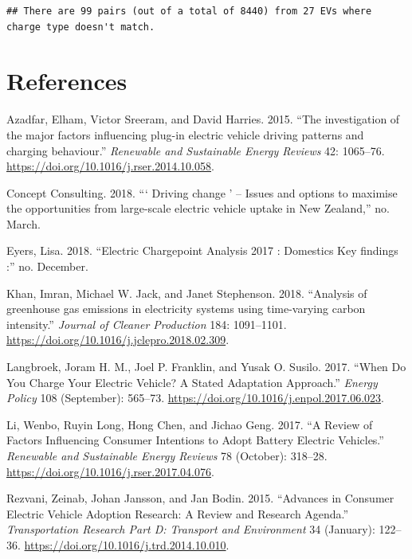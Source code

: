 \documentclass[]{article}
\begin{document}
\begin{verbatim}
## There are 99 pairs (out of a total of 8440) from 27 EVs where charge type doesn't match.
\end{verbatim}

\hypertarget{references}{%
\section*{References}\label{references}}

\hypertarget{refs}{}
\leavevmode\hypertarget{ref-Azadfar2015}{}%
Azadfar, Elham, Victor Sreeram, and David Harries. 2015. ``The investigation of the major factors influencing plug-in electric vehicle driving patterns and charging behaviour.'' \emph{Renewable and Sustainable Energy Reviews} 42: 1065--76. \url{https://doi.org/10.1016/j.rser.2014.10.058}.

\leavevmode\hypertarget{ref-ConceptConsulting2018}{}%
Concept Consulting. 2018. ``` Driving change ' -- Issues and options to maximise the opportunities from large-scale electric vehicle uptake in New Zealand,'' no. March.

\leavevmode\hypertarget{ref-Eyers2018}{}%
Eyers, Lisa. 2018. ``Electric Chargepoint Analysis 2017 : Domestics Key findings :'' no. December.

\leavevmode\hypertarget{ref-Khan2018}{}%
Khan, Imran, Michael W. Jack, and Janet Stephenson. 2018. ``Analysis of greenhouse gas emissions in electricity systems using time-varying carbon intensity.'' \emph{Journal of Cleaner Production} 184: 1091--1101. \url{https://doi.org/10.1016/j.jclepro.2018.02.309}.

\leavevmode\hypertarget{ref-langbroek_when_2017}{}%
Langbroek, Joram H. M., Joel P. Franklin, and Yusak O. Susilo. 2017. ``When Do You Charge Your Electric Vehicle? A Stated Adaptation Approach.'' \emph{Energy Policy} 108 (September): 565--73. \url{https://doi.org/10.1016/j.enpol.2017.06.023}.

\leavevmode\hypertarget{ref-li_review_2017}{}%
Li, Wenbo, Ruyin Long, Hong Chen, and Jichao Geng. 2017. ``A Review of Factors Influencing Consumer Intentions to Adopt Battery Electric Vehicles.'' \emph{Renewable and Sustainable Energy Reviews} 78 (October): 318--28. \url{https://doi.org/10.1016/j.rser.2017.04.076}.

\leavevmode\hypertarget{ref-rezvani_advances_2015}{}%
Rezvani, Zeinab, Johan Jansson, and Jan Bodin. 2015. ``Advances in Consumer Electric Vehicle Adoption Research: A Review and Research Agenda.'' \emph{Transportation Research Part D: Transport and Environment} 34 (January): 122--36. \url{https://doi.org/10.1016/j.trd.2014.10.010}.
\end{document}
